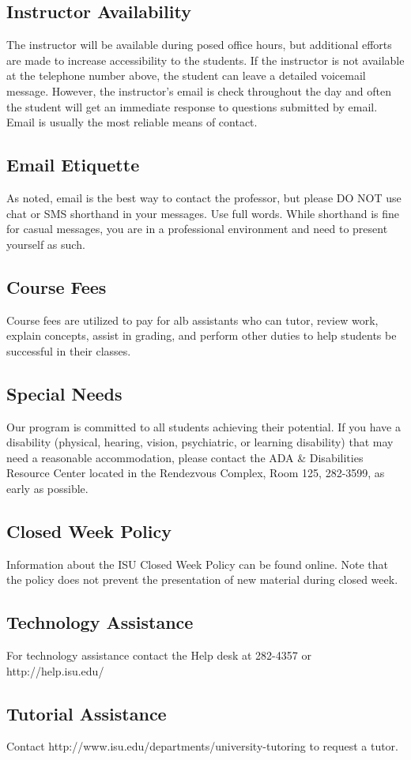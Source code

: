 \documentclass[a4paper,11pt,twocolumn]{article}
\begin{document}
\subsection*{Instructor Availability}
The instructor will be available during posed office hours, but additional efforts are made to increase accessibility to the students. If the instructor is not available at the telephone number above, the student can leave a detailed voicemail message. However, the instructor's email is check throughout the day and often the student will get an immediate response to questions submitted by email. Email is usually the most reliable means of contact.

\subsection*{Email Etiquette}
As noted, email is the best way to contact the professor, but please DO NOT use chat or SMS shorthand in your messages. Use full words. While shorthand is fine for casual messages, you are in a professional environment and need to present yourself as such.

\subsection*{Course Fees}
Course fees are utilized to pay for alb assistants who can tutor, review work, explain concepts, assist in grading, and perform other duties to help students be successful in their classes.

\subsection*{Special Needs}
Our program is committed to all students achieving their potential. If you have a disability (physical, hearing, vision, psychiatric, or learning disability) that may need a reasonable accommodation, please contact the ADA \& Disabilities Resource Center located in the Rendezvous Complex, Room 125, 282-3599, as early as possible.

\subsection*{Closed Week Policy}
Information about the ISU Closed Week Policy can be found online. Note that the policy does not prevent the presentation of new material during closed week.

\subsection*{Technology Assistance}
For technology assistance contact the Help desk at 282-4357 or http://help.isu.edu/

\subsection*{Tutorial Assistance}
Contact http://www.isu.edu/departments/university-tutoring to request a tutor.
\end{document}
